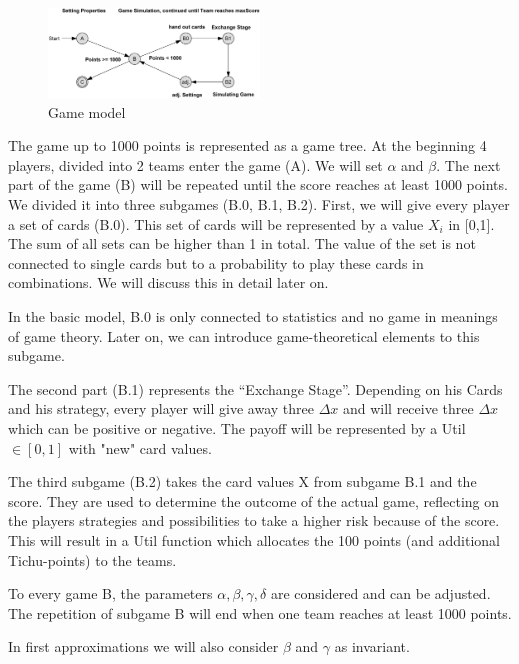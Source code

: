 \begin{figure}[h]
    \centering
    \includegraphics[width=0.5\textwidth]{Bilder/graph}
    \caption{Game model}
    \label{fig:meine-grafik}
\end{figure}

The game up to 1000 points is represented as a game tree.
At the beginning 4 players, divided into 2 teams enter the game (A). We will set $\alpha$ and $\beta$. 
The next part of the game (B) will be repeated until the score reaches at least 1000 points. We divided it into three subgames (B.0, B.1, B.2).
First, we will give every player a set of cards (B.0). This set of cards will be represented by a value $X_i$ in [0,1]. The sum of all sets can be higher than 1 in total. The value of the set is not connected to single cards but to a probability to play these cards in combinations. We will discuss this in detail later on.

In the basic model, B.0 is only connected to statistics and no game in meanings of game theory. Later on, we can introduce game-theoretical elements to this subgame. 

The second part (B.1) represents the “Exchange Stage”. Depending on his Cards and his strategy, every player will give away three $\Delta x$ and will receive three $\Delta x$ which can be positive or negative. The payoff will be represented by a Util$\in [0,1]$ with "new" card values.

The third subgame (B.2) takes the card values X from subgame B.1 and the score. They are used to determine the outcome of the actual game, reflecting on the players strategies and possibilities to take a higher risk because of the score. This will result in a Util function which allocates the 100 points (and additional Tichu-points) to the teams. 

To every game B, the parameters $\alpha, \beta, \gamma, \delta$ are considered and can be adjusted.  
The repetition of subgame B will end when one team reaches at least 1000 points. 

In first approximations we will also consider $\beta$ and $\gamma$ as invariant. 

